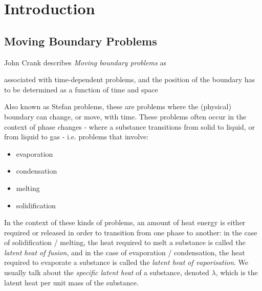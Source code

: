 \documentclass{report}
\begin{document}
\chapter{Introduction}










\section{Moving Boundary Problems}

John Crank describes \emph{Moving boundary problems} as\bigskip

\begin{displayquote}
associated with time-dependent problems, and the position of the boundary has to be determined as a 
function of time and space~\cite{crank1987free}
\end{displayquote}\medskip

Also known as Stefan problems, these are problems where the (physical) boundary can change, or move, 
with time. These problems often occur in the context of phase changes - where a substance transitions 
from solid to liquid, or from liquid to gas - i.e. problems that involve:\bigskip

\begin{itemize}

\item evaporation

\item condensation

\item melting

\item solidification

\end{itemize}\medskip

In the context of these kinds of problems, an amount of heat energy is either required or released in order 
to transition from one phase to another: in the case of solidification / melting, the heat required to melt 
a substance is called the \emph{latent heat of fusion}, and in the case of evaporation / condensation, the 
heat required to evaporate a substance is called the \emph{latent heat of vaporisation}. We usually talk 
about the \emph{specific latent heat} of a substance, denoted $\lambda$, which is the latent heat per unit 
mass of the substance.\bigskip
\end{document}
